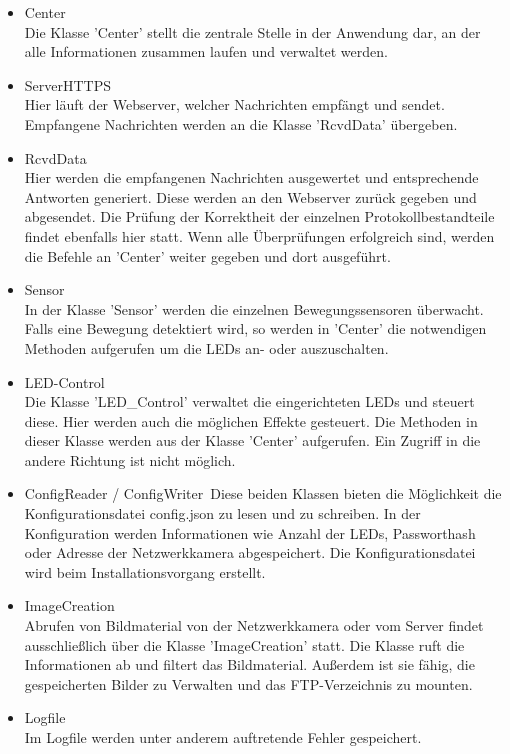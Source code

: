 \begin{itemize}
\item Center\\
Die Klasse 'Center' stellt die zentrale Stelle in der Anwendung dar, an der alle Informationen zusammen laufen und verwaltet werden.
\item ServerHTTPS\\
Hier läuft der Webserver, welcher Nachrichten empfängt und sendet. Empfangene Nachrichten werden an die Klasse 'RcvdData' übergeben.
\item RcvdData\\
Hier werden die empfangenen Nachrichten ausgewertet und entsprechende Antworten generiert. Diese werden an den Webserver zurück gegeben und abgesendet. Die Prüfung der Korrektheit der einzelnen Protokollbestandteile findet ebenfalls hier statt. Wenn alle Überprüfungen erfolgreich sind, werden die Befehle an 'Center' weiter gegeben und dort ausgeführt.
\item Sensor\\
In der Klasse 'Sensor' werden die einzelnen Bewegungssensoren überwacht. Falls eine Bewegung detektiert wird, so werden in 'Center' die notwendigen Methoden aufgerufen um die LEDs an- oder auszuschalten.
\item LED-Control\\
Die Klasse 'LED\_Control' verwaltet die eingerichteten LEDs und steuert diese. Hier werden auch die möglichen Effekte gesteuert. Die Methoden in dieser Klasse werden aus der Klasse 'Center' aufgerufen. Ein Zugriff in die andere Richtung ist nicht möglich.
\item ConfigReader / ConfigWriter\
Diese beiden Klassen bieten die Möglichkeit die Konfigurationsdatei config.json zu lesen und zu schreiben. In der Konfiguration werden Informationen wie Anzahl der LEDs, Passworthash oder Adresse der Netzwerkkamera abgespeichert. Die Konfigurationsdatei wird beim Installationsvorgang erstellt.
\item ImageCreation\\
Abrufen von Bildmaterial von der Netzwerkkamera oder vom Server findet ausschließlich über die Klasse 'ImageCreation' statt. Die Klasse ruft die Informationen ab und filtert das Bildmaterial. Außerdem ist sie fähig, die gespeicherten Bilder zu Verwalten und das FTP-Verzeichnis zu mounten.
\item Logfile\\
Im Logfile werden unter anderem auftretende Fehler gespeichert.
\end{itemize}


